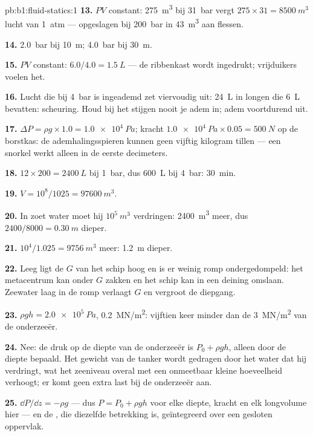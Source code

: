 \begin{solution}{pb:b1:fluid-statics:1}
\textbf{13.} $PV$ constant: \qty{275}{m^3} bij \qty{31}{bar} vergt $275 \times 31
= \qty{8500}{m^3}$ lucht van \qty{1}{atm} --- opgeslagen bij \qty{200}{bar} in
\qty{43}{m^3} aan flessen.

\textbf{14.} \qty{2.0}{bar} bij \qty{10}{m}; \qty{4.0}{bar} bij \qty{30}{m}.

\textbf{15.} $PV$ constant: $6.0/4.0 = \qty{1.5}{L}$ --- de ribbenkast wordt
ingedrukt; vrijduikers voelen het.

\textbf{16.} Lucht die bij \qty{4}{bar} is ingeademd zet viervoudig uit: \qty{24}{L} in longen
die \qty{6}{L} bevatten: scheuring. Houd bij het stijgen nooit je adem in; adem
voortdurend uit.

\textbf{17.} $\Delta P = \rho g \times 1.0 = \qty{1.0e4}{Pa}$; kracht $\qty{1.0e4}{Pa}
\times 0.05 = \qty{500}{N}$ op de borstkas: de ademhalingsspieren kunnen
geen vijftig kilogram tillen --- een snorkel werkt alleen in de eerste decimeters.

\textbf{18.} $12 \times 200 = \qty{2400}{L}$ bij \qty{1}{bar}, dus \qty{600}{L}
bij \qty{4}{bar}: \qty{30}{min}.

\textbf{19.} $V = 10^8/1025 = \qty{97600}{m^3}$.

\textbf{20.} In zoet water moet hij $10^5\ \unit{m^3}$ verdringen: \qty{2400}{m^3}
meer, dus $2400/8000 = \qty{0.30}{m}$ dieper.

\textbf{21.} $10^4/1.025 = \qty{9756}{m^3}$ meer: \qty{1.2}{m} dieper.

\textbf{22.} Leeg ligt de $G$ van het schip hoog en is er weinig romp ondergedompeld:
het metacentrum kan onder $G$ zakken en het schip kan in een deining omslaan.
Zeewater laag in de romp verlaagt $G$ en vergroot de diepgang.

\textbf{23.} $\rho gh = \qty{2.0e5}{Pa}$, \qty{0.2}{MN/m^2}: vijftien keer minder
dan de \qty{3}{MN/m^2} van de onderzeeër.

\textbf{24.} Nee: de druk op de diepte van de onderzeeër is $P_0 + \rho gh$,
alleen door de diepte bepaald. Het gewicht van de tanker wordt gedragen door het
water dat hij verdringt, wat het zeeniveau overal met een onmeetbaar kleine
hoeveelheid verhoogt; er komt geen extra last bij de onderzeeër aan.

\textbf{25.} $\dd P/\dd z = -\rho g$ --- dus $P = P_0 + \rho gh$ voor elke
diepte, kracht en elk longvolume hier --- en de , die
diezelfde betrekking is, geïntegreerd over een gesloten oppervlak.
\end{solution}
